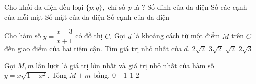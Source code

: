 \begin{ex}%
Cho khối đa diện đều loại $\{p;q\},$ chỉ số $p$ là ?
\choice
{Số đỉnh của đa diện}
{\True Số các cạnh của mỗi mặt}
{Số mặt của đa diện}
{Số cạnh của đa diện}
\end{ex}
\begin{ex}%
Cho hàm số $y=\dfrac{x-3}{x+1}$ có đồ thị $C.$ Gọi $d$ là khoảng cách từ một điểm $M$ trên $C$ đến
giao điểm của hai tiệm cận. Tìm giá trị nhỏ nhất của $d.$
\choice
{\True $2\sqrt{2}$}
{$3\sqrt{2}$}
{$\sqrt{2}$}
{$2\sqrt{3}$}
\end{ex} 
\begin{ex}%
Gọi $M, m$ lần lượt là giá trị lớn nhất và giá trị nhỏ nhất của hàm số $y=x\sqrt{1-x^2}$. Tổng $M+m$ bằng.
\choice
{\True $0$}
{$-1$}
{$1$}
{$2$}
\end{ex} 
